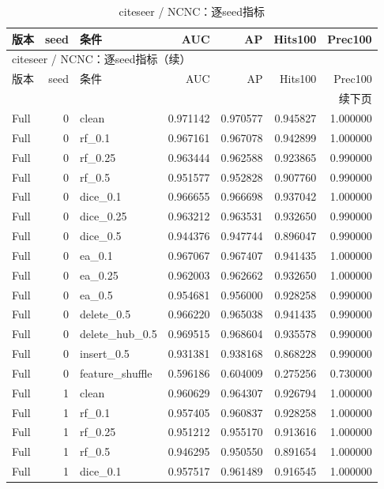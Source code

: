 \documentclass[UTF8,a4paper,11pt,fontset=fandol]{ctexart}
\begin{document}
{\footnotesize
\setlength{\tabcolsep}{3pt}
\begin{longtable}{lrlrrrr}
\caption{citeseer / NCNC：逐seed指标}\\
\toprule
版本 & seed & 条件 & AUC & AP & Hits100 & Prec100 \\
\midrule
\endfirsthead
\multicolumn{7}{l}{citeseer / NCNC：逐seed指标（续）}\\
\toprule
版本 & seed & 条件 & AUC & AP & Hits100 & Prec100 \\
\midrule
\endhead
\midrule\multicolumn{7}{r}{续下页}\\
\endfoot
\bottomrule\endlastfoot
Full & 0 & clean & 0.971142 & 0.970577 & 0.945827 & 1.000000 \\
Full & 0 & rf\_0.1 & 0.967161 & 0.967078 & 0.942899 & 1.000000 \\
Full & 0 & rf\_0.25 & 0.963444 & 0.962588 & 0.923865 & 0.990000 \\
Full & 0 & rf\_0.5 & 0.951577 & 0.952828 & 0.907760 & 0.990000 \\
Full & 0 & dice\_0.1 & 0.966655 & 0.966698 & 0.937042 & 1.000000 \\
Full & 0 & dice\_0.25 & 0.963212 & 0.963531 & 0.932650 & 0.990000 \\
Full & 0 & dice\_0.5 & 0.944376 & 0.947744 & 0.896047 & 0.990000 \\
Full & 0 & ea\_0.1 & 0.967067 & 0.967407 & 0.941435 & 1.000000 \\
Full & 0 & ea\_0.25 & 0.962003 & 0.962662 & 0.932650 & 1.000000 \\
Full & 0 & ea\_0.5 & 0.954681 & 0.956000 & 0.928258 & 0.990000 \\
Full & 0 & delete\_0.5 & 0.966220 & 0.965038 & 0.941435 & 0.990000 \\
Full & 0 & delete\_hub\_0.5 & 0.969515 & 0.968604 & 0.935578 & 0.990000 \\
Full & 0 & insert\_0.5 & 0.931381 & 0.938168 & 0.868228 & 0.990000 \\
Full & 0 & feature\_shuffle & 0.596186 & 0.604009 & 0.275256 & 0.730000 \\
Full & 1 & clean & 0.960629 & 0.964307 & 0.926794 & 1.000000 \\
Full & 1 & rf\_0.1 & 0.957405 & 0.960837 & 0.928258 & 1.000000 \\
Full & 1 & rf\_0.25 & 0.951212 & 0.955170 & 0.913616 & 1.000000 \\
Full & 1 & rf\_0.5 & 0.946295 & 0.950550 & 0.891654 & 1.000000 \\
Full & 1 & dice\_0.1 & 0.957517 & 0.961489 & 0.916545 & 1.000000 \\

\end{longtable}}
\end{document}
